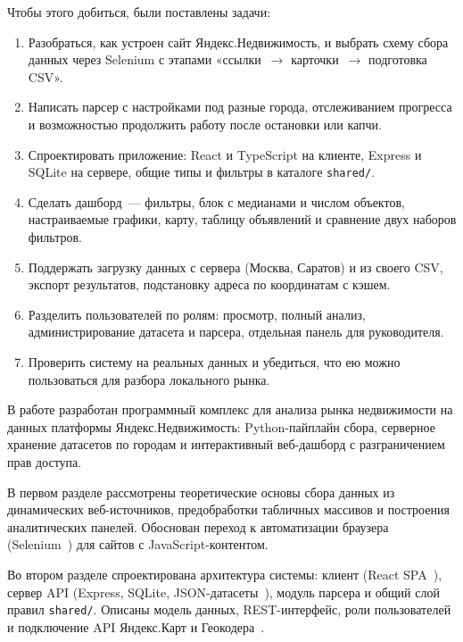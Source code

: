 \documentclass[coursework]{SCWorks}
\begin{document}
Чтобы этого добиться, были поставлены задачи:
\begin{enumerate}
    \item Разобраться, как устроен сайт Яндекс.Недвижимость, и выбрать схему сбора данных через Selenium с этапами «ссылки~$\rightarrow$ карточки~$\rightarrow$ подготовка CSV».
    \item Написать парсер с настройками под разные города, отслеживанием прогресса и возможностью продолжить работу после остановки или капчи.
    \item Спроектировать приложение: React и TypeScript на клиенте, Express и SQLite на сервере, общие типы и фильтры в каталоге \texttt{shared/}.
    \item Сделать дашборд~--- фильтры, блок с медианами и числом объектов, настраиваемые графики, карту, таблицу объявлений и сравнение двух наборов фильтров.
    \item Поддержать загрузку данных с сервера (Москва, Саратов) и из своего CSV, экспорт результатов, подстановку адреса по координатам с кэшем.
    \item Разделить пользователей по ролям: просмотр, полный анализ, администрирование датасета и парсера, отдельная панель для руководителя.
    \item Проверить систему на реальных данных и убедиться, что ею можно пользоваться для разбора локального рынка.
\end{enumerate}









\conclusion

В работе разработан программный комплекс для анализа рынка недвижимости на данных платформы Яндекс.Недвижимость: Python-пайплайн сбора, серверное хранение датасетов по городам и интерактивный веб-дашборд с разграничением прав доступа.

В первом разделе рассмотрены теоретические основы сбора данных из динамических веб-источников, предобработки табличных массивов и построения аналитических панелей. Обоснован переход к автоматизации браузера (Selenium~\cite{selenium}) для сайтов с JavaScript-контентом.

Во втором разделе спроектирована архитектура системы: клиент (React SPA~\cite{react,sultanov2022}), сервер API (Express, SQLite, JSON-датасеты~\cite{express,sqlite}), модуль парсера и общий слой правил \texttt{shared/}. Описаны модель данных, REST-интерфейс, роли пользователей и подключение API Яндекс.Карт и Геокодера~\cite{yandex-maps-api,yandex-geocoder}.
\end{document}
